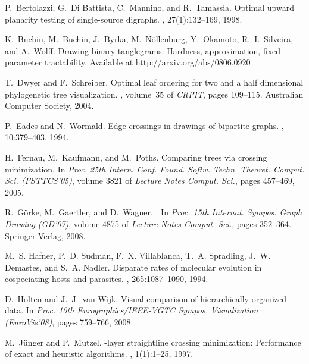 \documentclass[runningheads,a4paper]{llncs}
\begin{document}
\begin{thebibliography}{10}

P.~Bertolazzi, G.~{Di Battista}, C.~Mannino, and R.~Tamassia.
\newblock Optimal upward planarity testing of single-source digraphs.
, 27(1):132--169, 1998.

K.~Buchin, M.~Buchin, J.~Byrka, M.~N\"ollenburg, Y.~Okamoto,
R.~I.~Silveira, and A.~Wolff.
\newblock Drawing binary tanglegrams: Hardness, approximation, fixed-parameter
  tractability.
\newblock Available at http://arxiv.org/abs/0806.0920

T.~Dwyer and F.~Schreiber.
\newblock Optimal leaf ordering for two and a half dimensional phylogenetic
  tree visualization.
, volume~35 of {\em CRPIT}, pages
  109--115. Australian Computer Society, 2004.

P.~Eades and N.~Wormald.
\newblock Edge crossings in drawings of bipartite graphs.
, 10:379--403, 1994.

H.~Fernau, M.~Kaufmann, and M.~Poths.
\newblock Comparing trees via crossing minimization.
\newblock In {\em Proc. 25th Intern. Conf.
  Found. Softw. Techn. Theoret. Comput. Sci. (FSTTCS'05)}, volume 3821 of {\em
  Lecture Notes Comput. Sci.}, pages 457--469, 2005.

R.~G{\"o}rke, M.~Gaertler, and D.~Wagner.
.
\newblock In {\em Proc. 15th
  Internat. Sympos. Graph Drawing (GD'07)}, volume 4875 of {\em Lecture Notes
  Comput. Sci.}, pages 352--364. Springer-Verlag, 2008.

M.~S. Hafner, P.~D. Sudman, F.~X. Villablanca, T.~A. Spradling, J.~W. Demastes,
  and S.~A. Nadler.
\newblock Disparate rates of molecular evolution in cospeciating hosts and
  parasites.
, 265:1087--1090, 1994.

D.~Holten and J.~J.~van Wijk.
\newblock Visual comparison of hierarchically organized data.
\newblock In {\em Proc. 10th Eurographics/IEEE-VGTC Sympos. Visualization
  (EuroVis'08)}, pages 759--766, 2008.

M.~J\"unger and P.~Mutzel.
-layer straightline crossing minimization: Performance of exact and
  heuristic algorithms.
, 1(1):1--25, 1997.


\end{thebibliography}
\end{document}
